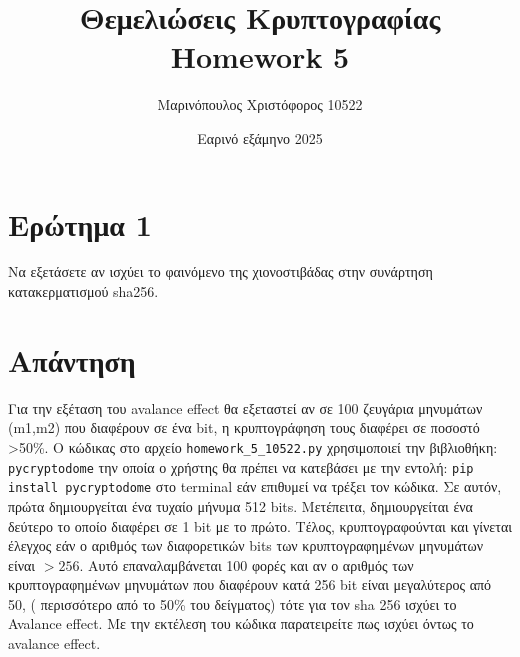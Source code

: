 \documentclass[12pt]{article}
\title{\vspace{-2cm} Θεμελιώσεις Κρυπτογραφίας \\
        Homework 5}
\author{Μαρινόπουλος Χριστόφορος 10522}
\date{Εαρινό εξάμηνο 2025}
\begin{document}
\maketitle

\section*{Ερώτημα 1}
Να εξετάσετε αν ισχύει το φαινόμενο της χιονοστιβάδας
στην συνάρτηση κατακερματισμού sha256.

\section*{Απάντηση}
Για την εξέταση του avalance effect θα εξεταστεί αν σε 100 ζευγάρια μηνυμάτων (m1,m2) που διαφέρουν σε ένα bit, η κρυπτογράφηση τους διαφέρει σε ποσοστό  >50\%. Ο κώδικας στο αρχείο \texttt{homework\_5\_10522.py} χρησιμοποιεί την βιβλιοθήκη: \texttt{pycryptodome} την οποία ο χρήστης θα πρέπει να κατεβάσει με την εντολή: \texttt{pip install pycryptodome} στο terminal εάν επιθυμεί να τρέξει τον κώδικα.
\newline
\newline
Σε αυτόν, πρώτα δημιουργείται ένα τυχαίο μήνυμα 512 bits. Μετέπειτα, δημιουργείται ένα δεύτερο το οποίο διαφέρει σε 1 bit με το πρώτο. Τέλος, κρυπτογραφούνται  και γίνεται έλεγχος εάν ο αριθμός των διαφορετικών bits των κρυπτογραφημένων μηνυμάτων είναι \( >256 \). Αυτό επαναλαμβάνεται 100 φορές και αν ο αριθμός των κρυπτογραφημένων μηνυμάτων που διαφέρουν κατά 256 bit είναι μεγαλύτερος από 50, ( περισσότερο από το 50\% του δείγματος) τότε για τον sha 256 ισχύει το Avalance effect.
\newline
\newline
Με την εκτέλεση του κώδικα παρατειρείτε πως ισχύει όντως το avalance effect.
\end{document}
